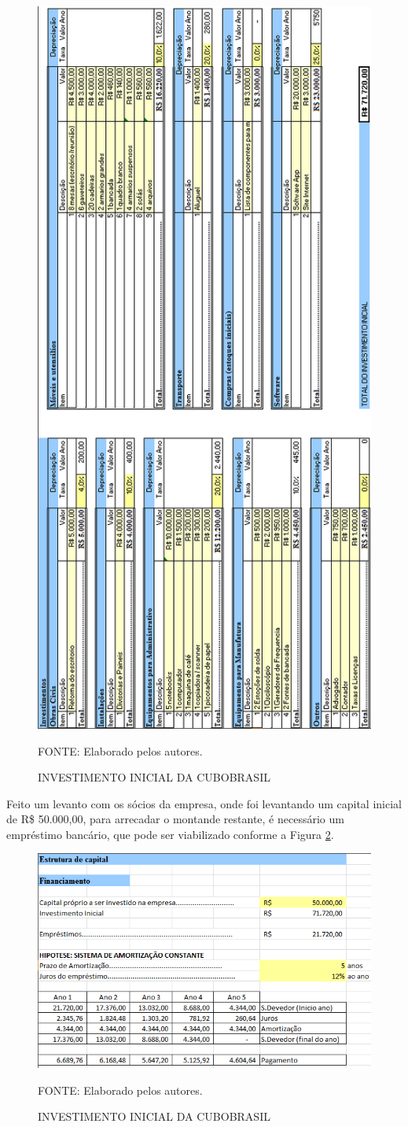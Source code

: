 \documentclass[
	12pt,				%
	openright,			%
	oneside,			%
	a4paper,			%
	english,			%
	french,				%
	spanish,			%
	brazil				%
	]{abntex2}
\begin{document}
	\begin{figure}[th]
		\caption{INVESTIMENTO INICIAL DA CUBOBRASIL}
		\label{inv_inicial}
		\centering
		\includegraphics[width=0.55\linewidth]{./figs/inv_inicial}
		
		\begin{small}
			FONTE: Elaborado pelos autores.
		\end{small}
	\end{figure}
	\pagebreak
	
	Feito um levanto com os sócios da empresa, onde foi levantando um capital inicial de R\$ 50.000,00, para arrecadar o montande restante, é necessário um empréstimo bancário, que pode ser viabilizado conforme a Figura \ref{emprestimo}.
	
	\begin{figure}[th]
		\caption{INVESTIMENTO INICIAL DA CUBOBRASIL}
		\label{emprestimo}
		\centering
		\includegraphics[width=0.8\linewidth]{./figs/emprestimo}
		
		\begin{small}
			FONTE: Elaborado pelos autores.
		\end{small}
	\end{figure}
	\pagebreak
\end{document}
